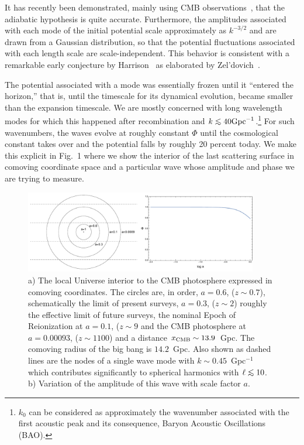 \documentclass[psfig,12pt]{article}
\def\lo{\mathrel{\raise.3ex\hbox{$<$}\mkern-14mu\lower0.6ex\hbox{$\sim$}}}
\begin{document}
It has recently been demonstrated, mainly using CMB
observations~\cite{Planck2015cosmopara}, that the adiabatic hypothesis
is quite accurate. Furthermore, the amplitudes associated with each mode
of the initial potential scale approximately as $k^{-3/2}$ and are drawn
from a Gaussian distribution, so that the potential fluctuations
associated with each length scale are scale-independent. This behavior
is consistent with a remarkable early conjecture by
Harrison~\cite{Harrison1970} as elaborated by
Zel'dovich~\cite{Zeldovich1972}.

The potential associated with a mode was essentially frozen until it
``entered the horizon,'' that is, until the timescale for its dynamical
evolution, became smaller than the expansion timescale. We are mostly
concerned with long wavelength modes for which this happened after
recombination and $k\lo40{\rm Gpc}^{-1}$.\footnote{$k_0$ can be
considered as approximately the wavenumber associated with the first
acoustic peak and its consequence, Baryon Acoustic Oscillations (BAO).}
For such wavenumbers, the waves evolve at roughly constant $\Phi$ until
the cosmological constant takes over and the potential falls by roughly
20 percent today. We make this explicit in Fig.~1 where we show the
interior of the last scattering surface in comoving coordinate space and
a particular wave whose amplitude and phase we are trying to measure.
\begin{figure}[t]
\centering
\includegraphics[width=4in]{figures/nsffig1.pdf}
\caption{\small{a) The local Universe interior to the CMB photosphere
expressed in comoving coordinates. The circles are, in order, $a=0.6$,
($z\sim0.7$), schematically the limit of present surveys, $a=0.3$,
($z\sim2$) roughly the effective limit of future surveys, the nominal
Epoch of Reionization at $a=0.1$, ($z\sim9$ and the CMB photosphere at
$a=0.00093$, ($z\sim1100$) and a distance $x_{\rm CMB}\sim13.9$~Gpc. The
comoving radius of the big bang is $14.2$~Gpc. Also shown as dashed
lines are the nodes of a single wave mode with $k\sim0.45$~Gpc$^{-1}$
which contributes significantly to spherical harmonics with $\ell\lo10$.
b) Variation of the amplitude of this wave with scale factor $a$.}}
\end{figure}
\end{document}

